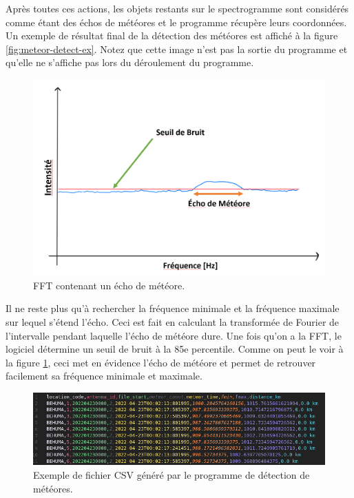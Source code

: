 \documentclass[11pt]{article}
\begin{document}
Après toutes ces actions, les objets restants sur le spectrogramme sont considérés comme étant des échos de météores et le programme récupère leurs coordonnées.
Un exemple de résultat final de la détection des météores est affiché à la figure \ref{fig:meteor-detect-ex}.
Notez que cette image n'est pas la sortie du programme et qu'elle ne s'affiche pas lors du déroulement du programme.

\begin{figure}[H]
    \begin{center}
        \includegraphics[scale=0.4]{Screenshot 2022-08-14 235407.png}
        \caption{FFT contenant un écho de météore.}
        \label{fig:meteor-fft}
    \end{center}
\end{figure}

Il ne reste plus qu'à rechercher la fréquence minimale et la fréquence maximale sur lequel s'étend l'écho.
Ceci est fait en calculant la transformée de Fourier de l'intervalle pendant laquelle l'écho de météore dure.
Une fois qu'on a la FFT, le logiciel détermine un seuil de bruit à la 85e percentile.
Comme on peut le voir à la figure \ref{fig:meteor-fft}, ceci met en évidence l'écho de météore et permet de retrouver facilement sa fréquence minimale et maximale.\\

\begin{figure}[h]
    \begin{center}
        \includegraphics[scale=0.44]{Screenshot from 2022-05-31 16-35-06.png}
        \caption{Exemple de fichier CSV généré par le programme de détection de météores.}
        \label{fig:csv-example}
    \end{center}
\end{figure}
\end{document}
